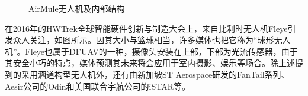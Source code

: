 \begin{figure}[htbp]
	\centering
        \caption{AirMule无人机及内部结构}\label{AirMule}
\end{figure}

在2016年的HWTrek全球智能硬件创新与制造大会上，来自比利时无人机Fleye引发众人关注，如图所示。因其大小与篮球相当，许多媒体也把它称为“球形无人机”。Fleye也属于DFUAV的一种，摄像头安装在上部，下部为光流传感器，由于其安全小巧的特点，媒体预测其未来将会应用于室内摄影、娱乐等场合。除上述提到的采用涵道构型无人机外，还有由新加坡ST Aerospace研发的FanTail系列\cite{mateosanguinoDesignStabilizationCoanda2024}、Aesir公司的Odin\cite{crivoi2013survey}和美国联合宇航公司的iSTAR\cite{flemingImprovingControlSystem,lipera2001micro}等。

